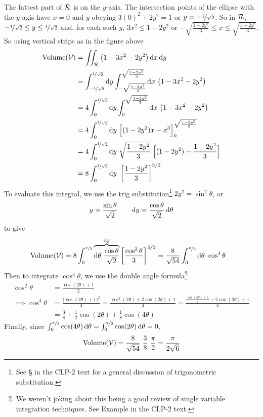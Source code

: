 \begin{eg}
The fattest part of $\mathcal{R}$ is on the $y$-axis. The intersection
points of the ellipse with the $y$-axis have $x=0$ and $y$
obeying $3(0)^2+2y^2 =1 $ or $y=\pm\nicefrac{1}{\sqrt{2}}$. So
in $\mathcal{R}$, $-\nicefrac{1}{\sqrt{2}}\le y\le \nicefrac{1}{\sqrt{2}}$
and, for each such $y$, $3x^2\le 1-2y^2$ or 
$-\sqrt{\frac{1-2y^2}{3}}\le x\le \sqrt{\frac{1-2y^2}{3}}$.
So using vertical strips as in the figure above
\begin{align*}
\text{Volume}(\cV) &=\dblInt_\cR \big(1-3x^2-2y^2\big)\,\dee{x}\,\dee{y} \\
   &=\int_{-\nicefrac{1}{\sqrt{2}}}^{\nicefrac{1}{\sqrt{2}}}\dee{y}
     \int_{-\sqrt{\frac{1-2y^2}{3}}}^{\sqrt{\frac{1-2y^2}{3}}}\dee{x}\ 
             \big(1-3x^2-2y^2\big) \\
   &=4\int_0^{\nicefrac{1}{\sqrt{2}}}\dee{y}
      \int_0^{\sqrt{\frac{1-2y^2}{3}}}\dee{x}\ 
             \big(1-3x^2-2y^2\big) \\
   &=4\int_0^{\nicefrac{1}{\sqrt{2}}}\dee{y}\ 
             \Big[(1-2y^2)x-x^3\Big]_0^{\sqrt{\frac{1-2y^2}{3}}} \\
   &=4\int_0^{\nicefrac{1}{\sqrt{2}}}\dee{y}\ 
             \sqrt{\frac{1-2y^2}{3}}\ \Big[(1-2y^2)-\frac{1-2y^2}{3}\Big] \\
   &=8\int_0^{\nicefrac{1}{\sqrt{2}}}\dee{y}\ 
             \left[\frac{1-2y^2}{3}\right]^{3/2} 
\end{align*}
To evaluate this integral, we use the trig 
substitution\footnote{See \S\eref{CLP101}{sec trigsub} in the CLP-2 text
for a general discussion of trigonometric substitution.}
$2y^2=\sin^2\theta$, or 
\begin{equation*}
y=\frac{\sin\theta}{\sqrt{2}}\qquad
\mathrm{d}y=\frac{\cos\theta}{\sqrt{2}}\,\mathrm{d}\theta
\end{equation*}
to give
\begin{align*} 
\text{Volume}(\cV) &= 8\int_0^{\nicefrac{\pi}{2}}
          \overbrace{\dee{\theta}\ \frac{\cos\theta}{\sqrt{2}} }^{\dee{y}}
           \left[\frac{\cos^2\theta}{3}\right]^{3/2} 
    =\frac{8}{\sqrt{54}}\int_0^{\nicefrac{\pi}{2}}\dee{\theta}\ 
                      \cos^4\theta
\end{align*}
Then to integrate $\cos^4\theta$, we use the double angle 
formula\footnote{We weren't joking about this being a good review of
single variable integration techniques. See Example  
in the CLP-2 text.}
\begin{align*}
\cos^2\theta &=\frac{\cos(2\theta)+1}{2} \\
\implies \cos^4\theta &= \frac{\big(\cos(2\theta)+1\big)^2}{4}
    =\frac{\cos^2(2\theta)+2\cos(2\theta)+1}{4}
    =\frac{\frac{\cos(4\theta)+1}{2}+2\cos(2\theta)+1}{4} \\
   &=\frac{3}{8} +\frac{1}{2}\cos(2\theta) +\frac{1}{8}\cos(4\theta)
\end{align*}
Finally, since $\int_0^{\nicefrac{\pi}{2}} \cos(4\theta)\,\mathrm{d}\theta
               =\int_0^{\nicefrac{\pi}{2}} \cos(2\theta)\,\mathrm{d}\theta
               =0$,
\begin{align*}
\text{Volume}(\mathcal{V}) = \frac{8}{\sqrt{54}}\ \frac{3}{8}\ \frac{\pi}{2}
  =\frac{\pi}{2\sqrt{6}}
\end{align*}



\end{eg}
